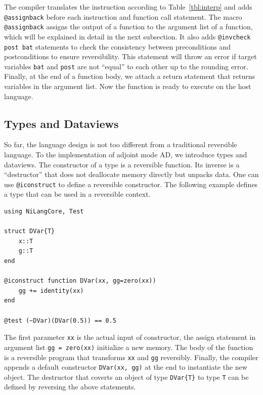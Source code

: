 \documentclass[aps,twocolumn,longbibliography,english,superscriptaddress]{revtex4-1}
\newcommand{\<}{\langle}
\renewcommand{\>}{\rangle}
\newcommand{\Tbl}[1]{Table~\ref{#1}}
\theoremstyle{definition}\newtheorem{definition}{\textit{Definition}}
\begin{document}
The compiler translates the instruction according to \Tbl{tbl:interp} and adds \texttt{@assignback} before each instruction and function call statement. The macro \texttt{@assignback} assigns the output of a function to the argument list of a function, which will be explained in detail in the next subsection.
It also adds \texttt{@invcheck post bat} statements to check the consistency between preconditions and postconditions to ensure reversibility. This statement will throw an error if target variables \texttt{bat} and \texttt{post} are not ``equal'' to each other up to the rounding error.
Finally, at the end of a function body, we attach a return statement that returns variables in the argument list.
Now the function is ready to execute on the host language.

\subsection{Types and Dataviews}
So far, the language design is not too different from a traditional reversible language. To the implementation of adjoint mode AD, we introduce types and dataviews.
The constructor of a type is a reversible function.
Its inverse is a ``destructor'' that does not deallocate memory directly but unpacks data.
One can use \texttt{@iconstruct} to define a reversible constructor.
The following example defines a type that can be used in a reversible context.

\begin{minipage}{.44\textwidth}
\begin{lstlisting}
using NiLangCore, Test

struct DVar{T}
    x::T
    g::T
end

@iconstruct function DVar(xx, gg=zero(xx))
    gg += identity(xx)
end

@test (~DVar)(DVar(0.5)) == 0.5
\end{lstlisting}
\end{minipage}

The first parameter \texttt{xx} is the actual input of constructor, the assign statement in argument list \texttt{gg = zero(xx)} initialize a new memory. The body of the function is a reversible program that transforms \texttt{xx} and \texttt{gg} reversibly. Finally, the compiler appends a default constructor \texttt{DVar(xx, gg)} at the end to instantiate the new object.
The destructor that coverts an object of type \texttt{DVar\{T\}} to type \texttt{T} can be defined by reversing the above statements.%
\end{document}
